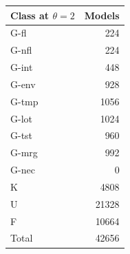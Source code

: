 \begin{center}\small
\begin{tabular}{@{}lr@{}}\toprule
Class at $\theta = 2$ & Models \\ \midrule
G-fl & 224 \\
G-nfl & 224 \\
G-int & 448 \\
G-env & 928 \\
G-tmp & 1056 \\
G-lot & 1024 \\
G-tst & 960 \\
G-mrg & 992 \\
G-nec & 0 \\
K & 4808 \\
U & 21328 \\
F & 10664 \\
\midrule Total & 42656 \\
\bottomrule\end{tabular}\end{center}
